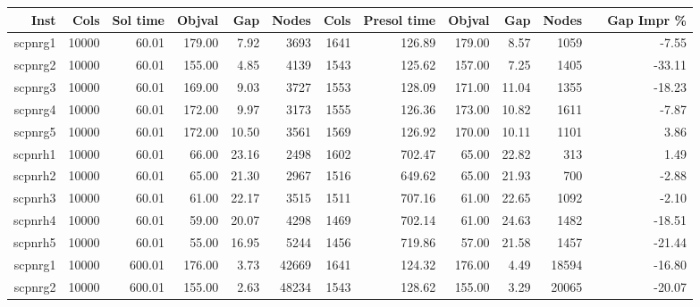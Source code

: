 \documentclass[11pt]{article}
\begin{document}
\begin{landscape}
    \begin{table}[]
        \begin{tabular}{rrr|rrr|rrrrr|rr}
            Inst & Cols  & Sol time & Objval & Gap   & Nodes & Cols & Presol time & Objval & Gap   & Nodes &  & Gap Impr \% \\
            \hline
            \hline
            scpnrg1 & 10000 & 60.01       & 179.00  & 7.92  & 3693      & 1641 & 126.89         & 179.00  & 8.57  & 1059      &  & -7.55    \\
            scpnrg2 & 10000 & 60.01       & 155.00  & 4.85  & 4139      & 1543 & 125.62         & 157.00  & 7.25  & 1405      &  & -33.11   \\
            scpnrg3 & 10000 & 60.01       & 169.00  & 9.03  & 3727      & 1553 & 128.09         & 171.00  & 11.04 & 1355      &  & -18.23   \\
            scpnrg4 & 10000 & 60.01       & 172.00  & 9.97  & 3173      & 1555 & 126.36         & 173.00  & 10.82 & 1611      &  & -7.87    \\
            scpnrg5 & 10000 & 60.01       & 172.00  & 10.50 & 3561      & 1569 & 126.92         & 170.00  & 10.11 & 1101      &  & 3.86     \\
            scpnrh1 & 10000 & 60.01       & 66.00   & 23.16 & 2498      & 1602 & 702.47         & 65.00   & 22.82 & 313       &  & 1.49     \\
            scpnrh2 & 10000 & 60.01       & 65.00   & 21.30 & 2967      & 1516 & 649.62         & 65.00   & 21.93 & 700       &  & -2.88    \\
            scpnrh3 & 10000 & 60.01       & 61.00   & 22.17 & 3515      & 1511 & 707.16         & 61.00   & 22.65 & 1092      &  & -2.10    \\
            scpnrh4 & 10000 & 60.01       & 59.00   & 20.07 & 4298      & 1469 & 702.14         & 61.00   & 24.63 & 1482      &  & -18.51   \\
            scpnrh5 & 10000 & 60.01       & 55.00   & 16.95 & 5244      & 1456 & 719.86         & 57.00   & 21.58 & 1457      &  & -21.44   \\
            \hline
            scpnrg1 & 10000 & 600.01      & 176.00  & 3.73  & 42669     & 1641 & 124.32         & 176.00  & 4.49  & 18594     &  & -16.80   \\
            scpnrg2 & 10000 & 600.01      & 155.00  & 2.63  & 48234     & 1543 & 128.62         & 155.00  & 3.29  & 20065     &  & -20.07   \\

\end{tabular}
\end{table}
\end{landscape}
\end{document}
